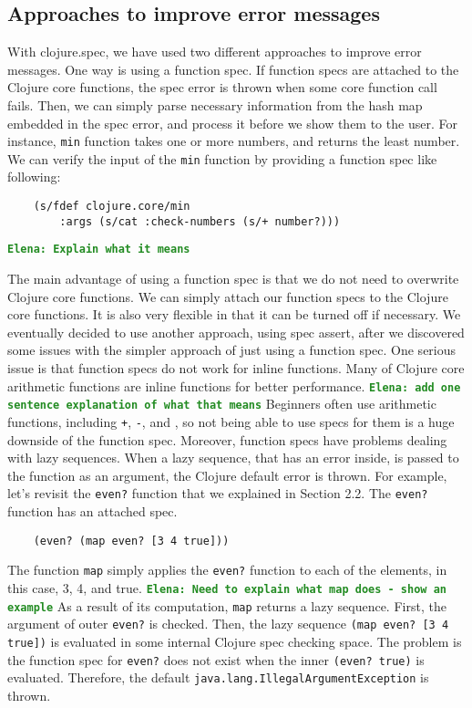 \documentclass[12pt]{article}
\newcommand{\comment}[1]{{\bf \tt  {#1}}}
\newcommand{\emcomment}[1]{\textcolor{ForestGreen}{\comment{Elena: {#1}}}}
\begin{document}
	\subsection{Approaches to improve error messages}
	With clojure.spec, we have used two different approaches to improve error messages. One way is using a function spec. 
	If function specs are attached to the Clojure core functions, the spec error is thrown when some core function 
	call fails. Then, we can simply parse necessary information from the hash map embedded in the spec error, and 
	process it before we show them to the user. For instance, {\tt min} function 
	takes one or more numbers, and returns the least number. We can verify the input of the {\tt min} function by providing a 
	function spec like following:

	\begin{verbatim}
	(s/fdef clojure.core/min
		:args (s/cat :check-numbers (s/+ number?)))
	\end{verbatim}
	\emcomment{Explain what it means}

	The main advantage of using a function spec is that we do not need to overwrite Clojure core functions. We can simply attach our 
	function specs to the Clojure core functions. It is also very flexible in that it can be turned off if necessary. 
	We eventually decided to use another approach, using spec assert, after we 
	discovered some issues with the simpler approach of just using a function spec. 
	One serious issue is that function specs do not work for inline functions.
	Many of Clojure core arithmetic functions are inline functions for better performance.
	\emcomment{add one sentence explanation of what that means}
	Beginners often use arithmetic functions, including {\tt +}, {\tt -}, and {\tt *}, 
	so not being able to use specs for them is a huge downside of the function spec. 
	Moreover, function specs have problems dealing with lazy sequences. When a lazy sequence, 
	that has an error inside, is passed to the function as an argument, the Clojure default error is thrown. 
	For example, let's revisit the {\tt even?} function that we explained in Section 2.2. 
	The {\tt even?} function has an attached spec.
	\begin{verbatim}
	(even? (map even? [3 4 true]))
	\end{verbatim}
	The function {\tt map} simply applies the {\tt even?} function to each of the elements, in this case, 3, 4, and true.
	\emcomment{Need to explain what map does - show an example}
	As a result of its computation, {\tt map} returns a lazy sequence.
	First, the argument of outer {\tt even?} is checked. Then, the lazy sequence {\tt (map even? [3 4 true])} is
	evaluated in some internal Clojure spec checking space. The problem is the function spec for {\tt even?} does not exist
	when the inner {\tt (even? true)} is evaluated. Therefore, the default {\tt java.lang.IllegalArgumentException} is thrown.
\end{document}

